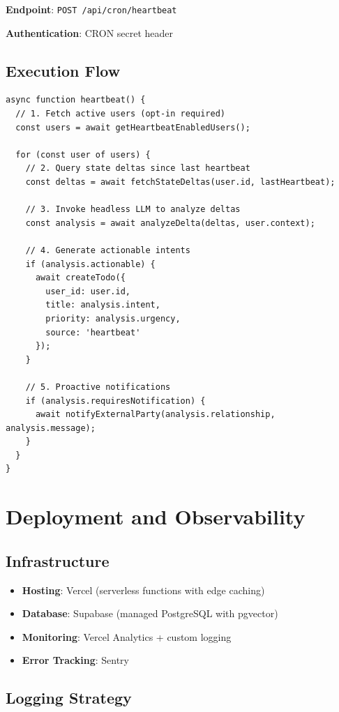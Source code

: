 \textbf{Endpoint}: \texttt{POST /api/cron/heartbeat}

\textbf{Authentication}: CRON secret header

\subsection{Execution Flow}

\begin{verbatim}
async function heartbeat() {
  // 1. Fetch active users (opt-in required)
  const users = await getHeartbeatEnabledUsers();

  for (const user of users) {
    // 2. Query state deltas since last heartbeat
    const deltas = await fetchStateDeltas(user.id, lastHeartbeat);

    // 3. Invoke headless LLM to analyze deltas
    const analysis = await analyzeDelta(deltas, user.context);

    // 4. Generate actionable intents
    if (analysis.actionable) {
      await createTodo({
        user_id: user.id,
        title: analysis.intent,
        priority: analysis.urgency,
        source: 'heartbeat'
      });
    }

    // 5. Proactive notifications
    if (analysis.requiresNotification) {
      await notifyExternalParty(analysis.relationship, analysis.message);
    }
  }
}
\end{verbatim}

\section{Deployment and Observability}

\subsection{Infrastructure}

\begin{itemize}
    \item \textbf{Hosting}: Vercel (serverless functions with edge caching)
    \item \textbf{Database}: Supabase (managed PostgreSQL with pgvector)
    \item \textbf{Monitoring}: Vercel Analytics + custom logging
    \item \textbf{Error Tracking}: Sentry
\end{itemize}

\subsection{Logging Strategy}

